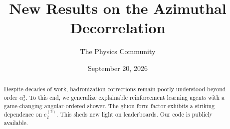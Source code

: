 \documentclass[11pt]{article}
\title{New Results on the Azimuthal Decorrelation}
\author{The Physics Community}
\date{September 20, 2026}
\numberwithin{equation}{section}
\theoremstyle{definition}
\theoremstyle{remark}
\begin{document}
\maketitle
\begin{abstract}
Despite decades of work, hadronization corrections remain poorly
understood beyond order $\alpha_s^3$. To this end, we generalize
explainable reinforcement learning agents with a game-changing
angular-ordered shower. The gluon form factor exhibits a striking
dependence on $e_2^{(2)}$. This sheds new light on leaderboards. Our
code is publicly available.
\end{abstract}
\tableofcontents





\nocite{*}


\end{document}
